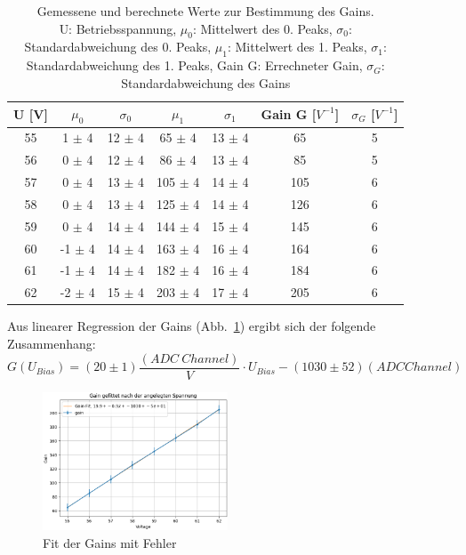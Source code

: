 \documentclass[12pt]{article}
\begin{document}
\begin{table}[h]
  \begin{center}
    \begin{tabular}{|c|c|c|c|c|c|c|}
      \hline
      U [V] & $\mu_{0}$ & $\sigma_{0}$ & $\mu_{1}$ &  $\sigma_{1}$ & Gain G [$V^{-1}$] & $\sigma_{G}$ [$V^{-1}$]\\
      \hline
      55 & 1 $\pm$ 4 & 12 $\pm$ 4 & 65 $\pm$ 4 & 13 $\pm$ 4 & 65 & 5 \\
      56 & 0 $\pm$ 4 & 12 $\pm$ 4 & 86 $\pm$ 4 & 13 $\pm$ 4 & 85 & 5 \\
      57 & 0 $\pm$ 4 & 13 $\pm$ 4 & 105 $\pm$ 4 & 14 $\pm$ 4 & 105 & 6 \\
      58 & 0 $\pm$ 4 & 13 $\pm$ 4 & 125 $\pm$ 4 & 14 $\pm$ 4 & 126 & 6 \\
      59 & 0 $\pm$ 4 & 14 $\pm$ 4 & 144 $\pm$ 4 & 15 $\pm$ 4 & 145 & 6 \\
      60 & -1 $\pm$ 4 & 14 $\pm$ 4 & 163 $\pm$ 4 & 16 $\pm$ 4 & 164 & 6 \\
      61 & -1 $\pm$ 4 & 14 $\pm$ 4 & 182 $\pm$ 4 & 16 $\pm$ 4 & 184 & 6 \\
      62 & -2 $\pm$ 4 & 15 $\pm$ 4 & 203 $\pm$ 4 & 17 $\pm$ 4 & 205 & 6 \\
      \hline
    \end{tabular}
    \caption{Gemessene und berechnete Werte zur Bestimmung des Gains.
    \\
    U: Betriebsspannung, $\mu_{0}$: Mittelwert des 0. Peaks, $\sigma_{0}$: Standardabweichung des 0. Peaks, $\mu_{1}$: Mittelwert des 1. Peaks, $\sigma_{1}$: Standardabweichung des 1. Peaks, Gain G: Errechneter Gain, $\sigma_{G}$: Standardabweichung des Gains}
    \label{GainBestimmtungTabelleEinzeln}
  \end{center}
\end{table}

Aus linearer Regression der Gains (Abb.~\ref{GainFit}) ergibt sich der folgende Zusammenhang:
\begin{equation}
    G(U_{Bias}) = (20 \pm1) \frac{(ADC~Channel)}{V} \cdot U_{Bias} - (1030 \pm52)  (ADC Channel)
\end{equation}


\begin{figure}[h!]
  \centering
  \includegraphics[width=0.49\textwidth]{Grafiken/gain_fit}
  \caption{Fit der Gains mit Fehler}
  \label{GainFit}
\end{figure}
\end{document}
